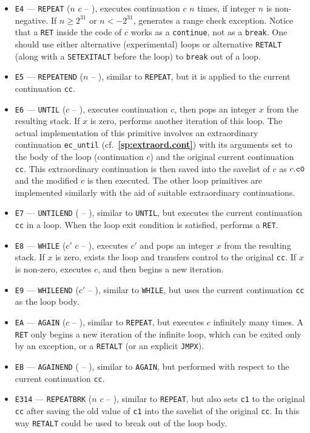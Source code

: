 \documentclass[12pt,oneside]{article}
\def\refpoint#1{{\rm\textbf{\ref{#1}}}}
\let\ptref=\refpoint
\begin{document}
\begin{itemize}
\item {\tt E4} --- {\tt REPEAT} ($n$ $c$ -- ), executes continuation $c$ $n$ times, if integer $n$ is non-negative. If $n\geq2^{31}$ or $n<-2^{31}$, generates a range check exception. Notice that a {\tt RET} inside the code of $c$ works as a {\tt continue}, not as a {\tt break}. One should use either alternative (experimental) loops or alternative {\tt RETALT} (along with a {\tt SETEXITALT} before the loop) to {\tt break} out of a loop.
\item {\tt E5} --- {\tt REPEATEND} ($n$ -- ), similar to {\tt REPEAT}, but it is applied to the current continuation {\tt cc}.
\item {\tt E6} --- {\tt UNTIL} ($c$ -- ), executes continuation $c$, then pops an integer $x$ from the resulting stack. If $x$ is zero, performs another iteration of this loop. The actual implementation of this primitive involves an extraordinary continuation {\tt ec\_until} (cf.~\ptref{sp:extraord.cont}) with its arguments set to the body of the loop (continuation $c$) and the original current continuation {\tt cc}. This extraordinary continuation is then saved into the savelist of $c$ as $c.{\tt c0}$ and the modified $c$ is then executed. The other loop primitives are implemented similarly with the aid of suitable extraordinary continuations.
\item {\tt E7} --- {\tt UNTILEND} ( -- ), similar to {\tt UNTIL}, but executes the current continuation {\tt cc} in a loop. When the loop exit condition is satisfied, performs a {\tt RET}.
\item {\tt E8} --- {\tt WHILE} ($c'$ $c$ -- ), executes $c'$ and pops an integer $x$ from the resulting stack. If $x$ is zero, exists the loop and transfers control to the original {\tt cc}. If $x$ is non-zero, executes $c$, and then begins a new iteration.
\item {\tt E9} --- {\tt WHILEEND} ($c'$ -- ), similar to {\tt WHILE}, but uses the current continuation {\tt cc} as the loop body.
\item {\tt EA} --- {\tt AGAIN} ($c$ -- ), similar to {\tt REPEAT}, but executes $c$ infinitely many times. A {\tt RET} only begins a new iteration of the infinite loop, which can be exited only by an exception, or a {\tt RETALT} (or an explicit {\tt JMPX}).
\item {\tt EB} --- {\tt AGAINEND} ( -- ), similar to {\tt AGAIN}, but performed with respect to the current continuation {\tt cc}.
\item {\tt E314} --- {\tt REPEATBRK} ($n$ $c$ -- ), similar to {\tt REPEAT}, but also sets {\tt c1} to the original {\tt cc} after saving the old value of {\tt c1} into the savelist of the original {\tt cc}. In this way {\tt RETALT} could be used to break out of the loop body.

\end{itemize}
\end{document}

